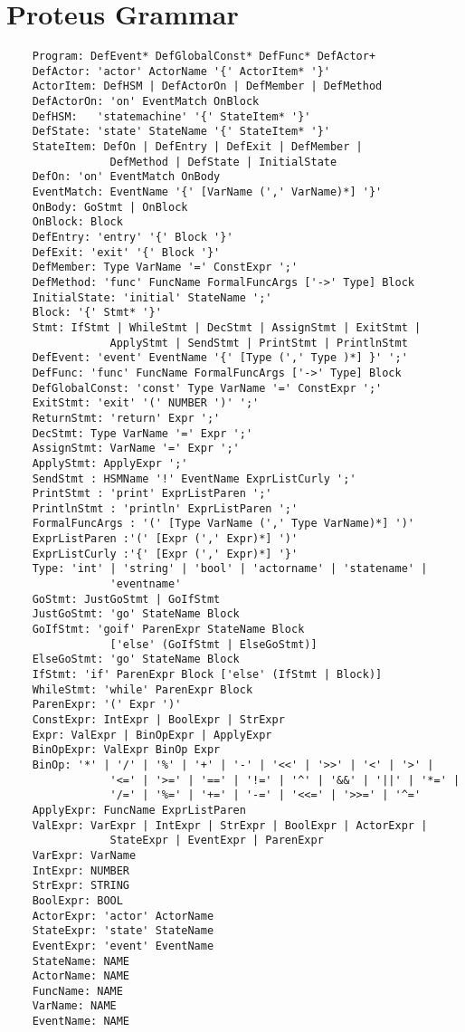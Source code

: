 \chapter{Proteus Grammar}\label{app:ProtGram}

\begin{verbatim}
    Program: DefEvent* DefGlobalConst* DefFunc* DefActor+
    DefActor: 'actor' ActorName '{' ActorItem* '}'
    ActorItem: DefHSM | DefActorOn | DefMember | DefMethod
    DefActorOn: 'on' EventMatch OnBlock
    DefHSM:   'statemachine' '{' StateItem* '}'
    DefState: 'state' StateName '{' StateItem* '}'
    StateItem: DefOn | DefEntry | DefExit | DefMember | 
                DefMethod | DefState | InitialState
    DefOn: 'on' EventMatch OnBody
    EventMatch: EventName '{' [VarName (',' VarName)*] '}'
    OnBody: GoStmt | OnBlock
    OnBlock: Block
    DefEntry: 'entry' '{' Block '}'
    DefExit: 'exit' '{' Block '}'
    DefMember: Type VarName '=' ConstExpr ';'
    DefMethod: 'func' FuncName FormalFuncArgs ['->' Type] Block
    InitialState: 'initial' StateName ';'
    Block: '{' Stmt* '}'
    Stmt: IfStmt | WhileStmt | DecStmt | AssignStmt | ExitStmt | 
                ApplyStmt | SendStmt | PrintStmt | PrintlnStmt
    DefEvent: 'event' EventName '{' [Type (',' Type )*] }' ';'
    DefFunc: 'func' FuncName FormalFuncArgs ['->' Type] Block
    DefGlobalConst: 'const' Type VarName '=' ConstExpr ';'
    ExitStmt: 'exit' '(' NUMBER ')' ';'
    ReturnStmt: 'return' Expr ';'
    DecStmt: Type VarName '=' Expr ';'
    AssignStmt: VarName '=' Expr ';'
    ApplyStmt: ApplyExpr ';'
    SendStmt : HSMName '!' EventName ExprListCurly ';'
    PrintStmt : 'print' ExprListParen ';'
    PrintlnStmt : 'println' ExprListParen ';'
    FormalFuncArgs : '(' [Type VarName (',' Type VarName)*] ')'
    ExprListParen :'(' [Expr (',' Expr)*] ')'
    ExprListCurly :'{' [Expr (',' Expr)*] '}'
    Type: 'int' | 'string' | 'bool' | 'actorname' | 'statename' | 
                'eventname'
    GoStmt: JustGoStmt | GoIfStmt
    JustGoStmt: 'go' StateName Block
    GoIfStmt: 'goif' ParenExpr StateName Block 
                ['else' (GoIfStmt | ElseGoStmt)]
    ElseGoStmt: 'go' StateName Block
    IfStmt: 'if' ParenExpr Block ['else' (IfStmt | Block)] 
    WhileStmt: 'while' ParenExpr Block 
    ParenExpr: '(' Expr ')' 
    ConstExpr: IntExpr | BoolExpr | StrExpr
    Expr: ValExpr | BinOpExpr | ApplyExpr
    BinOpExpr: ValExpr BinOp Expr 
    BinOp: '*' | '/' | '%' | '+' | '-' | '<<' | '>>' | '<' | '>' |
                '<=' | '>=' | '==' | '!=' | '^' | '&&' | '||' | '*=' | 
                '/=' | '%=' | '+=' | '-=' | '<<=' | '>>=' | '^='
    ApplyExpr: FuncName ExprListParen
    ValExpr: VarExpr | IntExpr | StrExpr | BoolExpr | ActorExpr | 
                StateExpr | EventExpr | ParenExpr
    VarExpr: VarName
    IntExpr: NUMBER 
    StrExpr: STRING 
    BoolExpr: BOOL
    ActorExpr: 'actor' ActorName
    StateExpr: 'state' StateName
    EventExpr: 'event' EventName
    StateName: NAME
    ActorName: NAME
    FuncName: NAME
    VarName: NAME
    EventName: NAME
\end{verbatim}